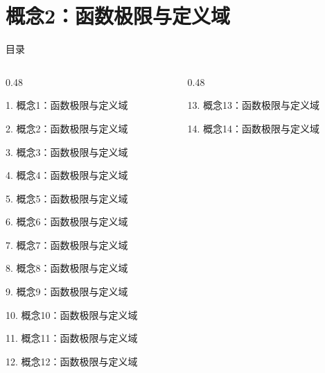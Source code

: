 \documentclass[aspectratio=169,10pt,fontset=fandol]{ctexbeamer}
\begin{document}
\section{概念2：函数极限与定义域}
\begin{frame}[t,fragile]{目录}
\small
\begin{columns}[T,onlytextwidth]
\begin{column}{0.48\textwidth}
{\color{black}\small 1. 概念1：函数极限与定义域\par}\vspace{0.22em}
{\color{blue}\small 2. 概念2：函数极限与定义域\par}\vspace{0.22em}
{\color{gray!40}\small 3. 概念3：函数极限与定义域\par}\vspace{0.22em}
{\color{gray!40}\small 4. 概念4：函数极限与定义域\par}\vspace{0.22em}
{\color{gray!40}\small 5. 概念5：函数极限与定义域\par}\vspace{0.22em}
{\color{gray!40}\small 6. 概念6：函数极限与定义域\par}\vspace{0.22em}
{\color{gray!40}\small 7. 概念7：函数极限与定义域\par}\vspace{0.22em}
{\color{gray!40}\small 8. 概念8：函数极限与定义域\par}\vspace{0.22em}
{\color{gray!40}\small 9. 概念9：函数极限与定义域\par}\vspace{0.22em}
{\color{gray!40}\small 10. 概念10：函数极限与定义域\par}\vspace{0.22em}
{\color{gray!40}\small 11. 概念11：函数极限与定义域\par}\vspace{0.22em}
{\color{gray!40}\small 12. 概念12：函数极限与定义域\par}\vspace{0.22em}
\end{column}
\begin{column}{0.48\textwidth}
{\color{gray!40}\small 13. 概念13：函数极限与定义域\par}\vspace{0.22em}
{\color{gray!40}\small 14. 概念14：函数极限与定义域\par}\vspace{0.22em}

\end{column}
\end{columns}
\end{frame}
\end{document}
